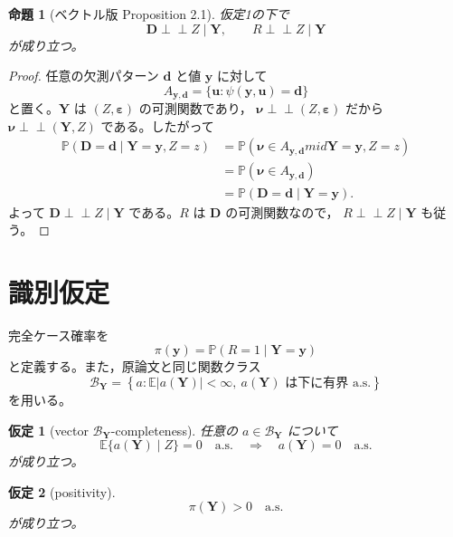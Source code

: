 \documentclass[11pt,a4paper]{article}
\newtheorem{assumption}{仮定}
\newtheorem{proposition}{命題}
\newcommand{\E}{\mathbb E}
\newcommand{\Prb}{\mathbb P}
\newcommand{\1}{\mathbf 1}
\newcommand{\Y}{\bm Y}
\newcommand{\D}{\bm D}
\newcommand{\indep}{\mathrel{\perp\!\!\!\perp}}
\begin{document}
\begin{proposition}[ベクトル版 Proposition 2.1]
\label{prop:vector-ci}
仮定1の下で
\begin{equation}
 \D\indep Z\mid\Y,
 \qquad
 R\indep Z\mid\Y
 \label{eq:vector-ci}
\end{equation}
が成り立つ。
\end{proposition}

\begin{proof}
任意の欠測パターン $\bm d$ と値 $\bm y$ に対して
\begin{equation}
 A_{\bm y,\bm d}
 =\{\bm u:\psi(\bm y,\bm u)=\bm d\}
\end{equation}
と置く。$\Y$ は $(Z,\bm\varepsilon)$ の可測関数であり，
$\bm\nu\indep(Z,\bm\varepsilon)$ だから
$\bm\nu\indep(\Y,Z)$ である。したがって
\begin{align}
 \Prb(\D=\bm d\mid\Y=\bm y,Z=z)
 &=\Prb(\bm\nu\in A_{\bm y,\bm d}mid\Y=\bm y,Z=z)\\
 &=\Prb(\bm\nu\in A_{\bm y,\bm d})\\
 &=\Prb(\D=\bm d\mid\Y=\bm y).
\end{align}
よって $\D\indep Z\mid\Y$ である。$R$ は $\D$ の可測関数なので，
$R\indep Z\mid\Y$ も従う。
\end{proof}

\section{識別仮定}

完全ケース確率を
\begin{equation}
 \pi(\bm y)=\Prb(R=1\mid\Y=\bm y)
\end{equation}
と定義する。また，原論文と同じ関数クラス
\begin{equation}
 \mathcal B_{\Y}
 =\left\{a:\E|a(\Y)|<\infty,
 \ a(\Y)\text{ は下に有界 a.s.}\right\}
 \label{eq:admissible-class}
\end{equation}
を用いる。

\begin{assumption}[vector $\mathcal B_{\Y}$-completeness]
任意の $a\in\mathcal B_{\Y}$ について
\begin{equation}
 \E\{a(\Y)\mid Z\}=0\quad\text{a.s.}
 \quad\Longrightarrow\quad
 a(\Y)=0\quad\text{a.s.}
 \label{eq:vector-completeness}
\end{equation}
が成り立つ。
\end{assumption}

\begin{assumption}[positivity]
\begin{equation}
 \pi(\Y)>0\quad\text{a.s.}
 \label{eq:positivity}
\end{equation}
が成り立つ。
\end{assumption}
\end{document}
